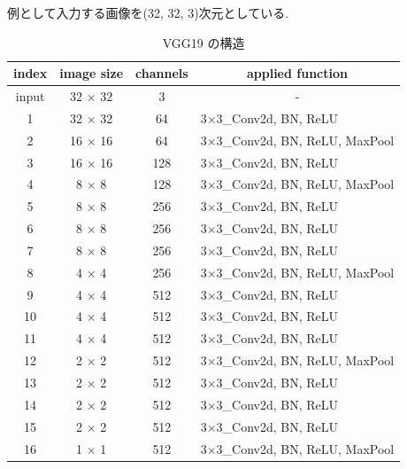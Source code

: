 \begin{table}[t]
  \begin{center}
    \caption{VGG19 の構造}
		\vspace{-1mm}
    例として入力する画像を(32, 32, 3)次元としている.
		\vspace{1mm}
		\vspace{3mm}
    \begin{tabular}{|c|c|c|l|}
    \hline
    \textbf{index} & \textbf{image size} & \textbf{channels} & \multicolumn{1}{c|}{\textbf{applied function}} \\ \hline
    input & 32 $\times$ 32 & 3   & \multicolumn{1}{c|}{-}         \\ \hline
    1     & 32 $\times$ 32 & 64  & 3$\times$3\_Conv2d, BN, ReLU          \\ \hline
    2     & 16 $\times$ 16 & 64  & 3$\times$3\_Conv2d, BN, ReLU, MaxPool \\ \hline
    3     & 16 $\times$ 16 & 128 & 3$\times$3\_Conv2d, BN, ReLU          \\ \hline
    4     & 8 $\times$ 8   & 128 & 3$\times$3\_Conv2d, BN, ReLU, MaxPool \\ \hline
    5     & 8 $\times$ 8   & 256 & 3$\times$3\_Conv2d, BN, ReLU          \\ \hline
    6     & 8 $\times$ 8   & 256 & 3$\times$3\_Conv2d, BN, ReLU          \\ \hline
    7     & 8 $\times$ 8   & 256 & 3$\times$3\_Conv2d, BN, ReLU          \\ \hline
    8     & 4 $\times$ 4   & 256 & 3$\times$3\_Conv2d, BN, ReLU, MaxPool \\ \hline
    9     & 4 $\times$ 4   & 512 & 3$\times$3\_Conv2d, BN, ReLU          \\ \hline
    10    & 4 $\times$ 4   & 512 & 3$\times$3\_Conv2d, BN, ReLU          \\ \hline
    11    & 4 $\times$ 4   & 512 & 3$\times$3\_Conv2d, BN, ReLU          \\ \hline
    12    & 2 $\times$ 2   & 512 & 3$\times$3\_Conv2d, BN, ReLU, MaxPool \\ \hline
    13    & 2 $\times$ 2   & 512 & 3$\times$3\_Conv2d, BN, ReLU          \\ \hline
    14    & 2 $\times$ 2   & 512 & 3$\times$3\_Conv2d, BN, ReLU          \\ \hline
    15    & 2 $\times$ 2   & 512 & 3$\times$3\_Conv2d, BN, ReLU          \\ \hline
    16    & 1 $\times$ 1   & 512 & 3$\times$3\_Conv2d, BN, ReLU, MaxPool \\ \hline
    \end{tabular}
    \label{tab:vgg}
  \end{center}
\end{table}


